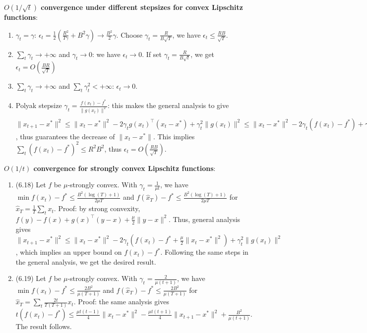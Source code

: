 \textbf{$O(1/\sqrt{t})$ convergence under different stepsizes for  convex Lipschitz functions}:
\begin{enumerate}
    \item $\gamma_t = \gamma$: $\epsilon_t = \frac{1}{2}(\frac{R^2}{T\gamma} + B^2\gamma) \rightarrow \frac{B^2}{2}\gamma$. Choose $\gamma_t = \frac{R}{B\sqrt{T}}$, we have $\epsilon_t \le \frac{RB}{\sqrt{T}}$.
    \item $\sum_t \gamma_t \rightarrow +\infty$ and $\gamma_t \rightarrow 0$: we have $\epsilon_t \rightarrow 0$. If set $\gamma_t = \frac{R}{B\sqrt{t}}$, we get $\epsilon_t = O(\frac{BR}{\sqrt{T}})$
    \item $\sum_t \gamma_t \rightarrow +\infty$ and $\sum_t \gamma_t^2 < +\infty$: $\epsilon_t \rightarrow 0$.
    \item Polyak stepsize $\gamma_t = \frac{f(x_t) - f^*}{\|g(x_t)\|^2}$: this makes the general analysis to give $\|x_{t+1} - x^*\|^2 \le \|x_t - x^*\|^2 - 2\gamma_t g(x_t)^\top (x_t - x^*) + \gamma_t^2 \|g(x_t)\|^2 \le \|x_t - x^*\|^2 - 2\gamma_t (f(x_t) - f^*) + \gamma_t^2 \|g(x_t)\|^2 = \|x_t - x^*\|^2 - \frac{(f(x_t) - f^*)^2}{\|g(x_t)\|^2} \le  \|x_t - x^*\|^2 - \frac{(f(x_t) - f^*)^2}{B^2}$, thus guarantees the decrease of $\|x_t - x^*\|$. This implies $\sum_t (f(x_t) - f^*)^2 \le R^2 B^2$, thus $\epsilon_t = O(\frac{RB}{\sqrt{T}})$.
\end{enumerate}

\textbf{$O(1/t)$ convergence for strongly convex Lipschitz functions}:
\begin{enumerate}
    \item (6.18) Let $f$ be $\mu$-strongly convex. With $\gamma_t = \frac{1}{\mu t}$, we have $\min f(x_t) - f^* \le \frac{B^2(\log(T)+1)}{2\mu T}$ and $f(\hat{x}_T) - f^* \le \frac{B^2(\log(T)+1)}{2\mu T}$ for $\hat{x}_T = \frac{1}{T}\sum_t x_t$. Proof: by strong convexity, $f(y) - f(x) + g(x)^\top (y-x) + \frac{\mu}{2}\|y-x\|^2$. Thus, general analysis gives $\|x_{t+1} - x^*\|^2 \le \|x_t-x^*\|^2 - 2\gamma_t (f(x_t) - f^* + \frac{\mu}{2}\|x_t - x^*\|^2) + \gamma_t^2 \|g(x_t)\|^2$, which implies an upper bound on $f(x_t) - f^*$. Following the same steps in the general analysis, we get the desired result.
    \item (6.19) Let $f$ be $\mu$-strongly convex. With $\gamma_t = \frac{2}{\mu (t+1)}$, we have $\min f(x_t) - f^* \le \frac{2B^2}{\mu (T+1)}$ and $f(\hat{x}_T) - f^* \le \frac{2B^2}{\mu (T+1)}$ for $\hat{x}_T = \sum_t \frac{2t}{T(T+1)} x_t$. Proof: the same analysis gives $t(f(x_t) - f^*) \le \frac{\mu t(t-1)}{4}\|x_t - x^*\|^2 - \frac{\mu t (t+1)}{4}\|x_{t+1}-x^*\|^2 + \frac{B^2}{\mu (t+1)}$. The result follows.
\end{enumerate}

